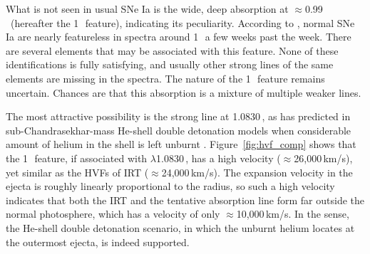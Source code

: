 \documentclass[twocolumn]{aastex631}
\begin{document}
What is not seen in usual SNe Ia is the wide, deep absorption at $\approx$0.99\,\micron\ (hereafter the 1\,\micron\ feature), indicating its peculiarity. According to \citet{Marion2009_NIR}, normal SNe Ia are nearly featureless in spectra around 1\,\micron\ a few weeks past the week. There are several elements that may be associated with this feature. None of these identifications is fully satisfying, and usually other strong lines of the same elements are missing in the spectra. The nature of the 1\,\micron\ feature remains uncertain. Chances are that this absorption is a mixture of multiple weaker lines.

The most attractive possibility is the strong  line at 1.0830\,\micron, as has predicted in sub-Chandrasekhar-mass He-shell double detonation models when considerable amount of helium in the shell is left unburnt \citep{Boyle2017_Helium}. Figure~\ref{fig:hvf_comp} shows that the 1\,\micron\ feature, if associated with  $\lambda$1.0830\,\micron, has a high velocity ($\approx$26,000\,km/s), yet similar as the HVFs of  IRT ($\approx$24,000\,km/s). The expansion velocity in the ejecta is roughly linearly proportional to the radius, so such a high velocity indicates that both the  IRT and the tentative  absorption line form far outside the normal photosphere, which has a velocity of only $\approx$10,000\,km/s. In the sense, the He-shell double detonation scenario, in which the unburnt helium locates at the outermost ejecta, is indeed supported.
\end{document}
